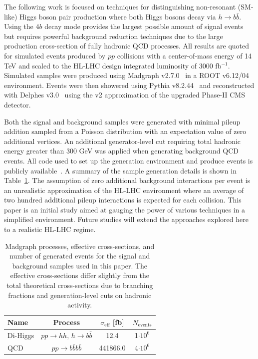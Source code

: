 The following work is focused on techniques for distinguishing non-resonant (SM-like) Higgs boson pair production where both Higgs bosons decay via $h \to b \bar{b}$. Using the $4b$ decay mode provides the largest possible amount of signal events but requires powerful background reduction techniques due to the large production cross-section of fully hadronic QCD processes. All results are quoted for simulated events produced by $pp$ collisions with a center-of-mass energy of 14 TeV and scaled to the HL-LHC design integrated luminosity of 3000 fb$^{-1}$. Simulated samples were produced using Madgraph v2.7.0~\cite{Alwall:2014hca} in a ROOT v6.12/04~\cite{Brun:1997pa} environment. Events were then showered using Pythia v8.2.44~\cite{Sj_strand_2015} and reconstructed with Delphes v3.0~\cite{de_Favereau_2014} using the v2 approximation of the upgraded Phase-II CMS detector.

Both the signal and background samples were generated with minimal pileup addition sampled from a Poisson distribution with an expectation value of zero additional vertices. An additional generator-level cut requiring total hadronic energy greater than 300 GeV was applied when generating background QCD events. All code used to set up the generation environment and produce events is publicly available~\cite{github}. A summary of the sample generation details is shown in Table~\ref{tab:samples}. The assumption of zero additional background interactions per event is an unrealistic approximation of the HL-LHC environment where an average of two hundred additional pileup interactions is expected for each collision. This paper is an initial study aimed at gauging the power of various techniques in a simplified environment. Future studies will extend the approaches explored here to a realistic HL-LHC regime.

\begin{table}[ht!]
 \label{tab:samples}
\centering
    \begin{tabular}{|l|c|c|c|} %
      \hline\hline
      Name & Process & $\sigma_{\textrm{eff}}$ [fb] & $N_{\textrm{events}}$ \\
      \hline
      Di-Higgs & $p p \rightarrow h h$, $h \rightarrow b \bar{b}$ & 12.4 & 1$\cdot 10^6$ \\
      QCD     & $p p \rightarrow b \bar{b} b \bar{b}$ & 441866.0 & 4$\cdot 10^6$ \\
      \hline\hline
    \end{tabular}
\caption{Madgraph processes, effective cross-sections, and number of generated events for the signal and background samples used in this paper. The effective cross-sections differ slightly from the total theoretical cross-sections due to branching fractions and generation-level cuts on hadronic activity.}
\end{table}

